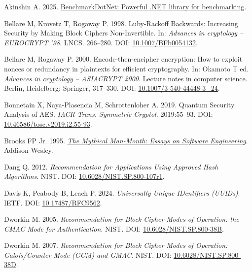 \documentclass[fleqn,10pt]{wlpeerj}
\newlength{\cslhangindent}
\newenvironment{CSLReferences}[2]
 {\begin{list}{}{%
  \setlength{\itemindent}{0pt}
  \setlength{\leftmargin}{0pt}
  \setlength{\parsep}{0pt}
  \ifodd #1
   \setlength{\leftmargin}{\cslhangindent}
   \setlength{\itemindent}{-1\cslhangindent}
  \fi
  \setlength{\itemsep}{#2\baselineskip}}}
 {\end{list}}
\begin{document}
\protect{}\label{refs}
\begin{CSLReferences}{1}{0}
Akinshin A. 2025.
\href{https://github.com/dotnet/BenchmarkDotNet/releases/tag/v0.15.8}{{BenchmarkDotNet:
Powerful .NET library for benchmarking}}.

Bellare M, Krovetz T, Rogaway P. 1998. {Luby-Rackoff Backwards:
Increasing Security by Making Block Ciphers Non-Invertible}. In:
\emph{Advances in cryptology -- EUROCRYPT '98}. LNCS. 266--280. DOI:
\href{https://doi.org/10.1007/BFb0054132}{10.1007/BFb0054132}.

Bellare M, Rogaway P. 2000. {Encode-then-encipher encryption: How to
exploit nonces or redundancy in plaintexts for efficient cryptography}.
In: Okamoto T ed. \emph{Advances in cryptology -- ASIACRYPT 2000}.
Lecture notes in computer science. Berlin, Heidelberg: Springer,
317--330. DOI:
\href{https://doi.org/10.1007/3-540-44448-3_24}{10.1007/3-540-44448-3\_24}.

Bonnetain X, Naya-Plasencia M, Schrottenloher A. 2019. {Quantum Security
Analysis of AES}. \emph{IACR Trans. Symmetric Cryptol.} 2019:55--93.
DOI:
\href{https://doi.org/10.46586/tosc.v2019.i2.55-93}{10.46586/tosc.v2019.i2.55-93}.

Brooks FP Jr. 1995.
\emph{\href{https://www.oreilly.com/library/view/mythical-man-month-the/0201835959/}{{The
Mythical Man-Month: Essays on Software Engineering}}}. Addison-Wesley.

Dang Q. 2012. \emph{{Recommendation for Applications Using Approved Hash
Algorithms}}. NIST. DOI:
\href{https://doi.org/10.6028/NIST.SP.800-107r1}{10.6028/NIST.SP.800-107r1}.

Davis K, Peabody B, Leach P. 2024. \emph{{Universally Unique IDentifiers
(UUIDs)}}. IETF. DOI:
\href{https://doi.org/10.17487/RFC9562}{10.17487/RFC9562}.

Dworkin M. 2005. \emph{{Recommendation for Block Cipher Modes of
Operation: the CMAC Mode for Authentication}}. NIST. DOI:
\href{https://doi.org/10.6028/NIST.SP.800-38B}{10.6028/NIST.SP.800-38B}.

Dworkin M. 2007. \emph{{Recommendation for Block Cipher Modes of
Operation: Galois/Counter Mode (GCM) and GMAC}}. NIST. DOI:
\href{https://doi.org/10.6028/NIST.SP.800-38D}{10.6028/NIST.SP.800-38D}.


\end{CSLReferences}
\end{document}
